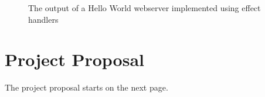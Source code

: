 \documentclass[%
    12pt,
    bibliography=toc,
    listof=leveldown,%
    oneside
]{book}
\begin{document}
\begin{appendices}
\begin{figure}
    \caption{The output of a Hello World webserver implemented using effect handlers}
    \label{fig:app-screenshot-webserver-hello-world}

\end{figure}

\chapter{Project Proposal}
\setcounter{page}{1}
The project proposal starts on the next page.
%

\end{appendices}
\end{document}
